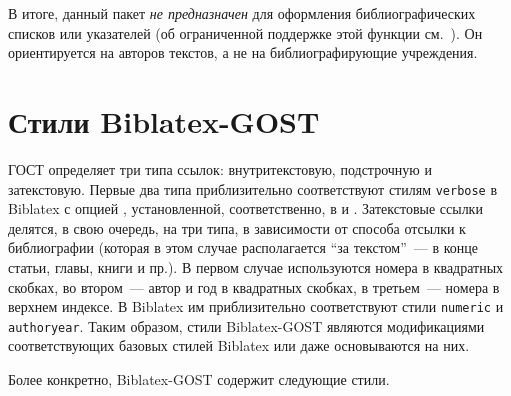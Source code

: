 \documentclass[10pt,a4paper,headings=small,numbers=enddot,english,russian]{ltxdockit}
\newcommand*{\biblatex}{Biblatex\xspace}
\newcommand*{\biblatexgost}{Biblatex-GOST\xspace}
\newcommand*{\bibsty}{\texttt}
\begin{document}
В итоге, данный пакет \emph{не предназначен} для оформления библиографических списков или
  указателей
  (об ограниченной поддержке этой функции см.~).
Он ориентируется на авторов текстов, а не на библиографирующие учреждения.

\section{Стили \biblatexgost}
\label{sec:styles}

ГОСТ определяет три типа ссылок: внутритекстовую, подстрочную и затекстовую.
Первые два типа приблизительно соответствуют стилям \bibsty{verbose} в \biblatex
с опцией , установленной, соответственно, в  и
. Затекстовые ссылки делятся, в свою очередь, на три типа, в зависимости
от способа отсылки к библиографии (которая в этом случае располагается
\enquote{за текстом}~--- в конце статьи, главы, книги и пр.).
В первом случае используются номера в квадратных скобках, во
втором~--- автор и год в квадратных скобках, в третьем~--- номера в верхнем индексе.
В \biblatex им приблизительно
соответствуют стили \bibsty{numeric} и \bibsty{authoryear}. Таким образом,
стили \biblatexgost являются модификациями соответствующих базовых стилей
\biblatex или даже основываются на них.

Более конкретно, \biblatexgost содержит следующие стили.
\end{document}
